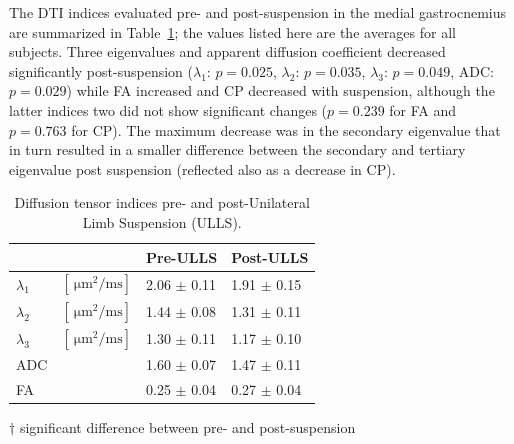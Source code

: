 The DTI indices evaluated pre- and post-suspension in the medial gastrocnemius are summarized in Table~\ref{tab: Karger1};
the values listed here are the averages for all subjects. Three eigenvalues and apparent diffusion coefficient  decreased significantly post-suspension ($\lambda_1$:  $p = 0.025$, $\lambda_2$: $p = 0.035$, $\lambda_3$: $p = 0.049$, ADC: $p = 0.029$) while FA increased and CP decreased with suspension, although the latter indices two did not show significant changes ($p = 0.239$ for FA and $p=0.763$ for CP). 
The maximum decrease was in the secondary eigenvalue that in turn resulted in a smaller difference between the secondary and tertiary eigenvalue post suspension (reflected also as a decrease in CP).
\begin{table}[!htb]
\vspace{+0.2cm}
\caption[Diffusion tensor indices pre- and post-suspension]{Diffusion tensor indices pre- and post-Unilateral Limb Suspension (ULLS).}
\label{tab: Karger1}
\begin{center}
\begin{threeparttable}
\begin{tabular}{@{}llll@{}}
\toprule[1pt]\midrule[0.3pt]
  &   & Pre-ULLS    & Post-ULLS   \\ \midrule
$\lambda_1$\tnote{$\dagger$} & $\left[\SI{}{\micro\meter^2 / \milli\second}\right]$ & 2.06 $\pm$ 0.11 & 1.91 $\pm$ 0.15 \\[6pt]
$\lambda_2$\tnote{$\dagger$} & $\left[\SI{}{\micro\meter^2 / \milli\second}\right]$ & 1.44 $\pm$ 0.08 & 1.31 $\pm$ 0.11 \\[6pt]
$\lambda_3$\tnote{$\dagger$}& $\left[\SI{}{\micro\meter^2 / \milli\second}\right]$ & 1.30 $\pm$ 0.11 & 1.17 $\pm$ 0.10 \\[6pt]
ADC\tnote{$\dagger$}   	&	& 1.60 $\pm$ 0.07 & 1.47 $\pm$ 0.11 \\[6pt]
FA   					&	& 0.25 $\pm$ 0.04 & 0.27 $\pm$ 0.04 \\ \midrule[0.3pt]\bottomrule[1pt]
\end{tabular}
\begin{tablenotes}[flushleft]\footnotesize
\item[$\dagger$] significant difference between pre- and post-suspension
\end{tablenotes}
\end{threeparttable}
\end{center}
\vspace{-0.2cm}
\end{table}
